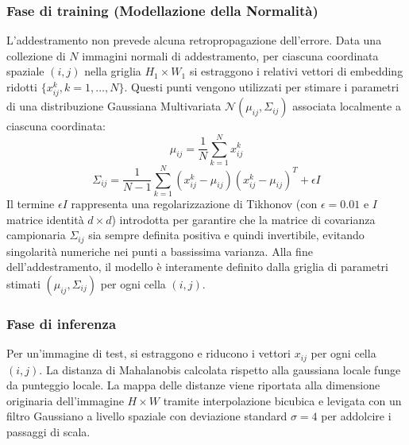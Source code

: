 \subsubsection{Fase di training (Modellazione della Normalità)}
L'addestramento non prevede alcuna retropropagazione dell'errore. Data una collezione di $N$ immagini normali di addestramento, per ciascuna coordinata spaziale $(i, j)$ nella griglia $H_1 \times W_1$ si estraggono i relativi vettori di embedding ridotti $\{x_{ij}^k, k=1, \dots, N\}$. 
Questi punti vengono utilizzati per stimare i parametri di una distribuzione Gaussiana Multivariata $\mathcal{N}(\mu_{ij}, \Sigma_{ij})$ associata localmente a ciascuna coordinata:
\begin{equation}
    \mu_{ij} = \frac{1}{N} \sum_{k=1}^N x_{ij}^k
\end{equation}
\begin{equation}
    \Sigma_{ij} = \frac{1}{N-1} \sum_{k=1}^N (x_{ij}^k - \mu_{ij})(x_{ij}^k - \mu_{ij})^T + \epsilon I
\end{equation}
Il termine $\epsilon I$ rappresenta una regolarizzazione di Tikhonov (con $\epsilon = 0.01$ e $I$ matrice identità $d \times d$) introdotta per garantire che la matrice di covarianza campionaria $\Sigma_{ij}$ sia sempre definita positiva e quindi invertibile, evitando singolarità numeriche nei punti a bassissima varianza. Alla fine dell'addestramento, il modello è interamente definito dalla griglia di parametri stimati $(\mu_{ij}, \Sigma_{ij})$ per ogni cella $(i, j)$.

\subsubsection{Fase di inferenza}
Per un'immagine di test, si estraggono e riducono i vettori $x_{ij}$ per ogni cella $(i, j)$. La distanza di Mahalanobis calcolata rispetto alla gaussiana locale funge da punteggio locale. La mappa delle distanze viene riportata alla dimensione originaria dell'immagine $H \times W$ tramite interpolazione bicubica e levigata con un filtro Gaussiano a livello spaziale con deviazione standard $\sigma=4$ per addolcire i passaggi di scala.

